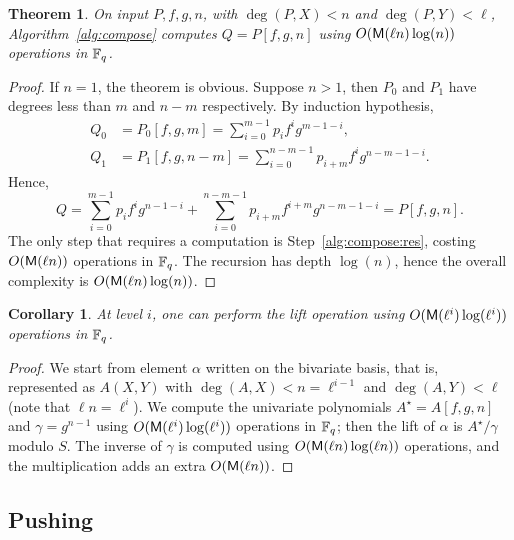 \documentclass{sig-alternate}
\newtheorem{theorem}[definition]{Theorem}
\newtheorem{corollary}[definition]{Corollary}
\begin{document}
\begin{theorem}
  \label{th:compose}
  On input $P,f,g,n$, with $\deg(P,X)<n$ and $\deg(P,Y) < \ell$,
  Algorithm~\ref{alg:compose} computes $Q=P[f,g,n]$ using $O(\mathsf{M}(\ell
  n)\log(n))$ operations in $\mathbb{F}_q$.
\end{theorem}
\begin{proof}
  If $n=1$, the theorem is obvious. Suppose $n>1$, then $P_0$ and
  $P_1$ have degrees less than $m$ and $n-m$ respectively. By
  induction hypothesis,
  \begin{equation*}
    \begin{aligned}
      Q_0 &= P_0[f,g,m] = \sum_{i=0}^{m-1}p_if^ig^{m-1-i},\\
      Q_1 &= P_1[f,g,n-m] = \sum_{i=0}^{n-m-1}p_{i+m}f^ig^{n-m-1-i}.   
    \end{aligned}
  \end{equation*}
  Hence,
  \begin{equation*}
    Q = \sum_{i=0}^{m-1}p_if^ig^{n-1-i} +
    \sum_{i=0}^{n-m-1}p_{i+m}f^{i+m}g^{n-m-1-i} =
    P[f,g,n].
  \end{equation*}
  The only step that requires a computation is
  Step~\ref{alg:compose:res}, costing $O(\mathsf{M}(\ell n))$ operations in
  $\mathbb{F}_q$. The recursion has depth $\log(n)$, hence the overall
  complexity is $O(\mathsf{M}(\ell n)\log(n))$.
\end{proof}

\begin{corollary}
  At level $i$, one can perform the lift operation using
  $O(\mathsf{M}(\ell^i)\log(\ell^i))$ operations in $\mathbb{F}_q$.
\end{corollary}
\begin{proof}
  We start from element $\alpha$ written on the bivariate basis, that
  is, represented as $A(X,Y)$ with $\deg(A,X)<n=\ell^{i-1}$ and
  $\deg(A,Y)<\ell$ (note that $\ell n =\ell^i$).  We compute the
  univariate polynomials $A^\star=A[f,g,n]$ and $\gamma=g^{n-1}$ using
  $O(\mathsf{M}(\ell^i)\log(\ell^i))$ operations in $\mathbb{F}_q$; then the lift
  of $\alpha$ is $A^\star/\gamma$ modulo $S$. The inverse of $\gamma$
  is computed using $O(\mathsf{M}(\ell n)\log(\ell n))$ operations, and the
  multiplication adds an extra $O(\mathsf{M}(\ell n))$.
\end{proof}


\subsection{Pushing}
\end{document}
